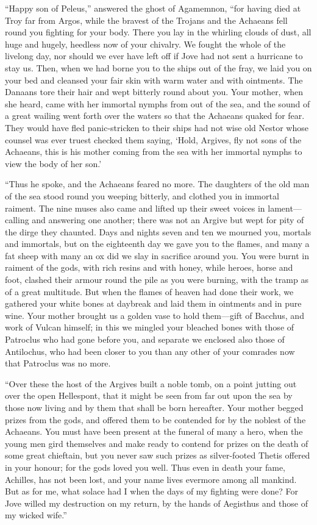 “Happy son of Peleus,” answered the ghost of Agamemnon, “for having died at
Troy far from Argos, while the bravest of the Trojans and the Achaeans fell
round you fighting for your body. There you lay in the whirling clouds of dust,
all huge and hugely, heedless now of your chivalry. We fought the whole of the
livelong day, nor should we ever have left off if Jove had not sent a hurricane
to stay us. Then, when we had borne you to the ships out of the fray, we laid
you on your bed and cleansed your fair skin with warm water and with ointments.
The Danaans tore their hair and wept bitterly round about you. Your mother,
when she heard, came with her immortal nymphs from out of the sea, and the
sound of a great wailing went forth over the waters so that the Achaeans quaked
for fear. They would have fled panic-stricken to their ships had not wise old
Nestor whose counsel was ever truest checked them saying, ‘Hold, Argives, fly
not sons of the Achaeans, this is his mother coming from the sea with her
immortal nymphs to view the body of her son.’

“Thus he spoke, and the Achaeans feared no more. The daughters of the old man
of the sea stood round you weeping bitterly, and clothed you in immortal
raiment. The nine muses also came and lifted up their sweet voices in
lament—calling and answering one another; there was not an Argive but wept for
pity of the dirge they chaunted. Days and nights seven and ten we mourned you,
mortals and immortals, but on the eighteenth day we gave you to the flames, and
many a fat sheep with many an ox did we slay in sacrifice around you. You were
burnt in raiment of the gods, with rich resins and with honey, while heroes,
horse and foot, clashed their armour round the pile as you were burning, with
the tramp as of a great multitude. But when the flames of heaven had done their
work, we gathered your white bones at daybreak and laid them in ointments and
in pure wine. Your mother brought us a golden vase to hold them—gift of
Bacchus, and work of Vulcan himself; in this we mingled your bleached bones
with those of Patroclus who had gone before you, and separate we enclosed also
those of Antilochus, who had been closer to you than any other of your comrades
now that Patroclus was no more.

“Over these the host of the Argives built a noble tomb, on a point jutting out
over the open Hellespont, that it might be seen from far out upon the sea by
those now living and by them that shall be born hereafter. Your mother begged
prizes from the gods, and offered them to be contended for by the noblest of
the Achaeans. You must have been present at the funeral of many a hero, when
the young men gird themselves and make ready to contend for prizes on the death
of some great chieftain, but you never saw such prizes as silver-footed Thetis
offered in your honour; for the gods loved you well. Thus even in death your
fame, Achilles, has not been lost, and your name lives evermore among all
mankind. But as for me, what solace had I when the days of my fighting were
done? For Jove willed my destruction on my return, by the hands of Aegisthus
and those of my wicked wife.”

